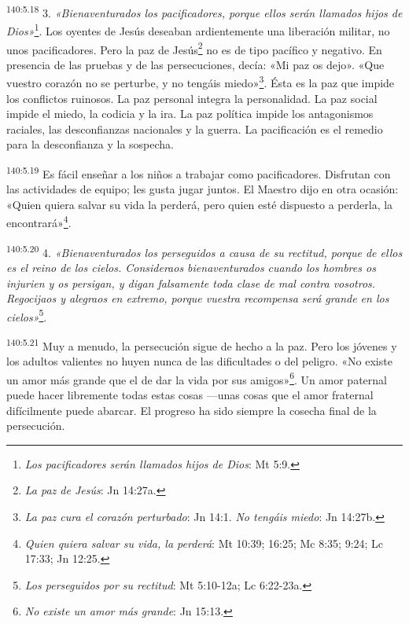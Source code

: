 \par
\textsuperscript{140:5.18} 3. \textit{«Bienaventurados los pacificadores, porque ellos serán llamados hijos de Dios»}\footnote{\textit{Los pacificadores serán llamados hijos de Dios}: Mt 5:9.}. Los oyentes de Jesús deseaban ardientemente una liberación militar, no unos pacificadores. Pero la paz de Jesús\footnote{\textit{La paz de Jesús}: Jn 14:27a.} no es de tipo pacífico y negativo. En presencia de las pruebas y de las persecuciones, decía: «Mi paz os dejo». «Que vuestro corazón no se perturbe, y no tengáis miedo»\footnote{\textit{La paz cura el corazón perturbado}: Jn 14:1. \textit{No tengáis miedo}: Jn 14:27b.}. Ésta es la paz que impide los conflictos ruinosos. La paz personal integra la personalidad. La paz social impide el miedo, la codicia y la ira. La paz política impide los antagonismos raciales, las desconfianzas nacionales y la guerra. La pacificación es el remedio para la desconfianza y la sospecha.

\par
\textsuperscript{140:5.19} Es fácil enseñar a los niños a trabajar como pacificadores. Disfrutan con las actividades de equipo; les gusta jugar juntos. El Maestro dijo en otra ocasión: «Quien quiera salvar su vida la perderá, pero quien esté dispuesto a perderla, la encontrará»\footnote{\textit{Quien quiera salvar su vida, la perderá}: Mt 10:39; 16:25; Mc 8:35; 9:24; Lc 17:33; Jn 12:25.}.

\par
\textsuperscript{140:5.20} 4. \textit{«Bienaventurados los perseguidos a causa de su rectitud, porque de ellos es el reino de los cielos. Consideraos bienaventurados cuando los hombres os injurien y os persigan, y digan falsamente toda clase de mal contra vosotros. Regocijaos y alegraos en extremo, porque vuestra recompensa será grande en los cielos»}\footnote{\textit{Los perseguidos por su rectitud}: Mt 5:10-12a; Lc 6:22-23a.}.

\par
\textsuperscript{140:5.21} Muy a menudo, la persecución sigue de hecho a la paz. Pero los jóvenes y los adultos valientes no huyen nunca de las dificultades o del peligro. «No existe un amor más grande que el de dar la vida por sus amigos»\footnote{\textit{No existe un amor más grande}: Jn 15:13.}. Un amor paternal puede hacer libremente todas estas cosas ---unas cosas que el amor fraternal difícilmente puede abarcar. El progreso ha sido siempre la cosecha final de la persecución.


